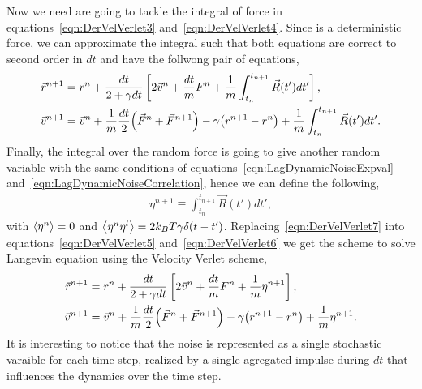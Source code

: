 Now we need are going to tackle the integral of force in equations~\eqref{eqn:DerVelVerlet3} and~\eqref{eqn:DerVelVerlet4}.
Since is a deterministic force, we can approximate the integral such that both equations are correct to second order in $dt$ and have the follwong pair of equations,
\begin{align}
    \vec{r}^{n+1} &= r^n
                    +\frac{dt}{2+\gamma dt}\left[ 
                        2\vec{v}^{n}                
                        +\frac{dt}{m}F^{n}
                        +\frac{1}{m}\int_{t_n}^{t_{n+1}}\vec{R}(t')dt'
                    \right]\label{eqn:DerVelVerlet5}
                    , \\
    \vec{v}^{n+1} &= \vec{v}^{n}
                     +\frac{1}{m}\frac{dt}{2}\qty(\vec{F}^{n} + \vec{F}^{n+1})
                     -\gamma\qty(r^{n+1}-r^n)
                     +\frac{1}{m}\int_{t_n}^{t_{n+1}}\vec{R}(t')dt'\label{eqn:DerVelVerlet6}.
\end{align}
Finally, the integral over the random force is going to give another random variable with the same conditions of equations~\eqref{eqn:LagDynamicNoiseExpval} and~\eqref{eqn:LagDynamicNoiseCorrelation}, hence we can define the following,
\begin{gather}
    \eta^{n+1}\equiv\int_{t_n}^{t_{n+1}}\vec{R}(t')dt'\label{eqn:DerVelVerlet7},
\end{gather}
with $\expval{\eta^{n}}=0$ and $\expval{\eta^{n}\eta^{l}}=2k_{B}T\gamma\delta\qty(t-t')$.
Replacing~\eqref{eqn:DerVelVerlet7} into equations~\eqref{eqn:DerVelVerlet5} and~\eqref{eqn:DerVelVerlet6} we get the scheme to solve Langevin equation using the Velocity Verlet scheme,
\begin{align}
    \vec{r}^{n+1} &= r^n
                    +\frac{dt}{2+\gamma dt}\left[ 
                        2\vec{v}^{n}                
                        +\frac{dt}{m}F^{n}
                        +\frac{1}{m}\eta^{n+1}
                    \right]\label{eqn:DerVelVerlet5}
                    , \\
    \vec{v}^{n+1} &= \vec{v}^{n}
                     +\frac{1}{m}\frac{dt}{2}\qty(\vec{F}^{n} + \vec{F}^{n+1})
                     -\gamma\qty(r^{n+1}-r^n)
                     +\frac{1}{m}\eta^{n+1}\label{eqn:DerVelVerlet6}.
\end{align}
It is interesting to notice that the noise is represented as a single stochastic varaible for each time step, realized by a single agregated impulse during $dt$ that influences the dynamics over the time step.

